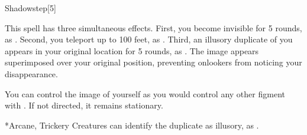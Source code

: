 \begin{spellsection}{Shadowstep}[5]
    \begin{spellheader}
    \end{spellheader}
    \begin{spellcontent}
        \begin{spelltargetinginfo}
        \end{spelltargetinginfo}
        \begin{spelleffects}
            \spelleffect This spell has three simultaneous effects.
            First, you become invisible for 5 rounds, as .
            Second, you teleport up to 100 feet, as .
            Third, an illusory duplicate of you appears in your original location for 5 rounds, as .
            The image appears superimposed over your original position, preventing onlookers from noticing your disappearance.

            You can control the image of yourself as you would control any other figment with . If not directed, it remains stationary.
        \end{spelleffects}
    \end{spellcontent}
    \begin{spellfooter}
        *{Arcane, Trickery}
        \spellnotes Creatures can identify the duplicate as illusory, as .
        \miscastexplode
    \end{spellfooter}
    \begin{spellaugments}
    \end{spellaugments}
\end{spellsection}

